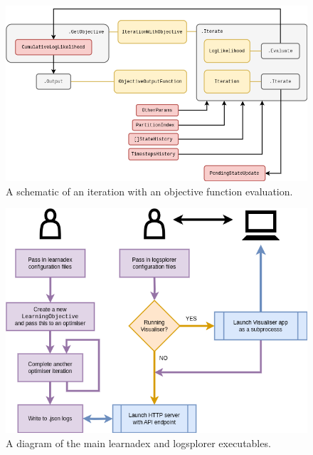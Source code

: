 \begin{figure}[h]
\centering
\includegraphics[width=14cm]{images/chapter-4-learnadex-data-iterator.drawio.png}
\caption{A schematic of an iteration with an objective function evaluation.}
\label{fig:learnadex-data-iterator}
\end{figure}


\begin{figure}[h]
\centering
\includegraphics[width=13cm]{images/chapter-4-learnadex-main.drawio.png}
\caption{A diagram of the main learnadex and logsplorer executables.}
\label{fig:learnadex-main}
\end{figure}
    